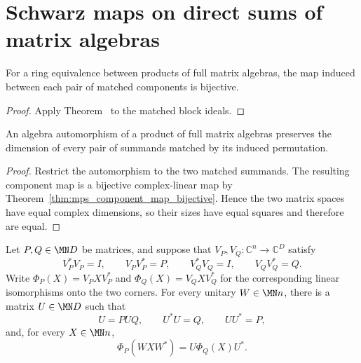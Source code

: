 \section{Schwarz maps on direct sums of matrix algebras}




\begin{theorem}
    \label{thm:mps_component_map_bijective}
    \leanok

    For a ring equivalence between products of full matrix algebras, the map
    induced between each pair of matched components is bijective.
\end{theorem}

\begin{proof}\leanok

    Apply Theorem~\cite[``Paired component maps are bijections'']{QICLean2026Blueprint} to the matched block
    ideals.
\end{proof}

\begin{theorem}
    \label{thm:mps_dim_preserved}
    \leanok
    An algebra automorphism of a product of full matrix algebras preserves
    the dimension of every pair of summands matched by its induced
    permutation.
\end{theorem}

\begin{proof}\leanok
    Restrict the automorphism to the two matched summands. The resulting
    component map is a bijective complex-linear map by
    Theorem~\ref{thm:mps_component_map_bijective}. Hence the two matrix
    spaces have equal complex dimensions, so their sizes have equal squares
    and therefore are equal.
\end{proof}


\begin{theorem}%
    \label{thm:corner_compression_partial_isometry_transport}
    \leanok
    Let $P,Q\in\MN D$ be matrices, and suppose that
    $V_P,V_Q:\mathbb C^n\to\mathbb C^D$ satisfy
    \[
        V_P^*V_P=I,\qquad V_PV_P^*=P,\qquad
        V_Q^*V_Q=I,\qquad V_QV_Q^*=Q.
    \]
    Write $\Phi_P(X)=V_PXV_P^*$ and $\Phi_Q(X)=V_QXV_Q^*$ for the
    corresponding linear isomorphisms onto the two corners. For every unitary
    $W\in\MN n$, there is a matrix $U\in\MN D$ such that
    \[
        U=PUQ,\qquad U^*U=Q,\qquad UU^*=P,
    \]
    and, for every $X\in\MN n$,
    \[
        \Phi_P(WXW^*)=U\Phi_Q(X)U^*.
    \]
\end{theorem}

